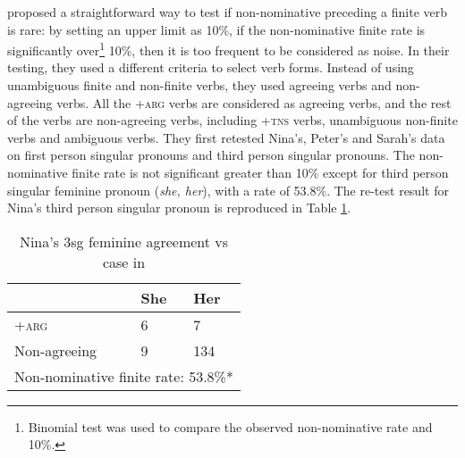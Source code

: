 \cite{pine2005testing} proposed a straightforward way to test if  non-nominative preceding a finite verb is rare: by setting an upper limit as 10\%, if the non-nominative finite rate is significantly over\footnote{Binomial test was used to compare the observed non-nominative rate and 10\%.} 10\%, then it is too frequent to be considered as noise. In their testing, they used a different criteria to select verb forms. Instead of using unambiguous finite and non-finite verbs, they used agreeing verbs and non-agreeing verbs. All the \textsc{+arg} verbs are considered as agreeing verbs, and the rest of the verbs are non-agreeing verbs, including \textsc{+tns} verbs, unambiguous non-finite verbs and ambiguous verbs. They first retested Nina's, Peter's and Sarah's data on first person singular pronouns and third person singular pronouns. The non-nominative finite rate is not significant greater than 10\% except for third person singular feminine pronoun (\textit{she, her}), with a rate of 53.8\%. The re-test result for Nina's third person singular pronoun is reproduced in Table \ref{table:nina}.
\FloatBarrier
\begin{table}[!h]
\centering
\caption{Nina's 3sg feminine agreement vs case in \cite{pine2005testing}}
\label{table:nina}
\begin{tabular}{lll}
\toprule
 & She & Her \\
 \hline
\textsc{+arg} & 6 & 7  \\
Non-agreeing & 9 & 134  \\
\hline
\multicolumn{3}{l}{Non-nominative finite rate: 53.8\%*}\\
\bottomrule
\end{tabular}
\end{table}
\FloatBarrier

